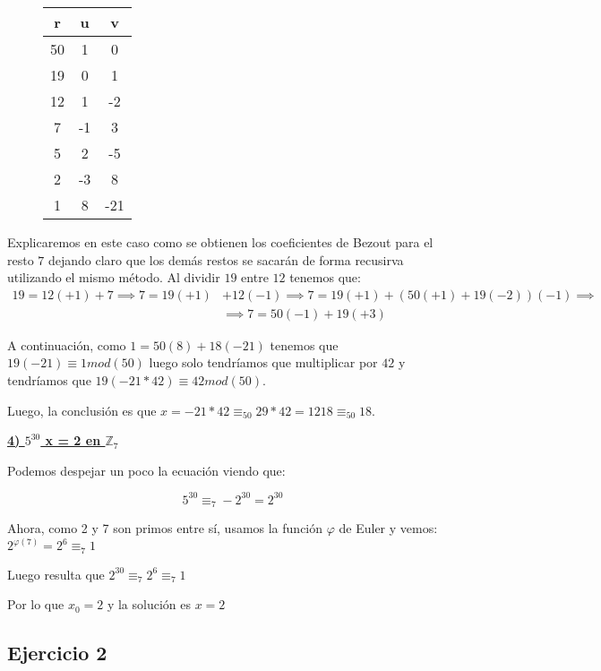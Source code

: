 \documentclass[11pt, a4paper, titlepage]{article}
\providecommand{\ent}{\mathbb{Z}}
\begin{document}
\begin{figure}[H]
\label{my-label}
\begin{center}
\begin{tabular}{|c|c|c|}
\hline
\textbf{r} & \textbf{u} & \textbf{v} \\ \hline
50         & 1          & 0          \\ \hline
19         & 0          & 1          \\ \hline
12         & 1         & -2          \\ \hline
7          & -1         & 3          \\ \hline
5          & 2          & -5         \\ \hline
2          & -3         & 8          \\ \hline
1          & 8          & -21        \\ \hline
\end{tabular}
\end{center}
\end{figure}
Explicaremos en este caso como se obtienen los coeficientes de Bezout para el resto $7$ dejando claro que los demás restos se sacarán de forma recusirva utilizando el mismo método. Al dividir $19$ entre $12$ tenemos que:
\begin{align*}
19=12(+1)+7 \implies 7=19(+1)&+12(-1) \implies 7=19(+1)+(50(+1)+19(-2))(-1)\implies \\
&\implies 7=50(-1)+19(+3)
\end{align*}

A continuación, como $1=50(8)+18(-21)$ tenemos que $19(-21)\equiv1 mod(50)$ luego solo tendríamos que multiplicar por $42$ y tendríamos que $19(-21*42)\equiv42 mod(50)$.

Luego, la conclusión es que $x=-21*42\equiv_{50}29*42=1218\equiv_{50} 18$.

\underline{\textbf{4) $5^{30}$ x = 2 en $\ent_7$ }}

Podemos despejar un poco la ecuación viendo que:

\[
5^{30} \equiv_7 -2^{30} = 2^{30}
\]

Ahora, como 2 y 7 son primos entre sí, usamos la función $\varphi $ de Euler y vemos: $2^{\varphi(7)} = 2^6 \equiv_7 1$

Luego resulta que $2^{30}\equiv_7 2^6 \equiv_7 1$

Por lo que $x_0 = 2$ y la solución es $x=2$


\subsection{\LARGE{Ejercicio 2}}
\end{document}
